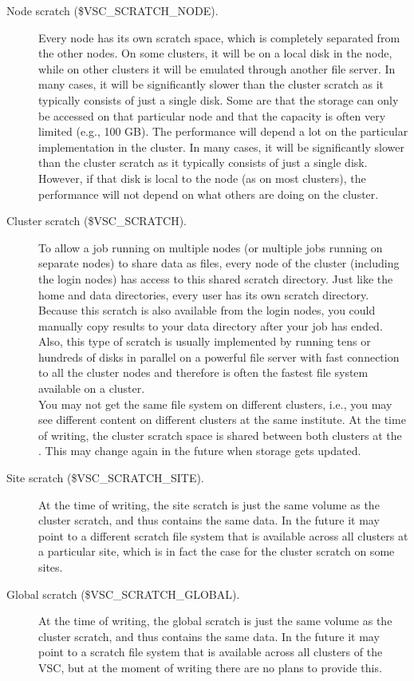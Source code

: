 \begin{description}
\item[Node scratch (\$VSC\_SCRATCH\_NODE).]
Every node has its own scratch space, which is completely separated from the other nodes.
On some clusters, it will be on a local disk in the node, while on other
clusters it will be emulated through another file server. In many cases,
it will be significantly slower than the cluster scratch as it typically
consists of just a single disk.
Some  are that the storage
can only be accessed on that particular node and that the capacity is often very limited (e.g., 100 GB).
The performance will depend a lot on the particular implementation in the cluster. In many cases,
it will be significantly slower than the cluster scratch as it typically
consists of just a single disk. However, if that disk is local to the node
(as on most clusters), the performance will not depend on what others are
doing on the cluster.
\item[Cluster scratch (\$VSC\_SCRATCH).]
To allow a job running on multiple nodes (or multiple jobs running on
separate nodes) to share data as files, every node of the cluster
(including the login nodes) has access to this shared scratch directory.
Just like the home and data directories, every user has its own scratch
directory. Because this scratch is also available from the login nodes, you
could manually copy results to your data directory after your job has
ended. Also, this type of scratch is usually implemented by running tens or
hundreds of disks in parallel on a powerful file server with fast connection
to all the cluster nodes and therefore is often the fastest file system
available on a cluster. \\
You may not get the same file system on different clusters, i.e., you
may see different content on different clusters at the same institute.
\ifantwerpen
  At the time of writing, the cluster scratch space is shared between both clusters
  at the \university. This may change again in the future when storage gets
  updated.
\fi
\item[Site scratch (\$VSC\_SCRATCH\_SITE).]
At the time of writing, the site scratch is just the same
volume as the cluster scratch, and thus contains the same data.
In the future it may point to a different scratch file system
that is available across all clusters at a particular site, which is in
fact the case for the cluster scratch on some sites.
\item[Global scratch (\$VSC\_SCRATCH\_GLOBAL).]
At the time of writing, the global scratch is just the same
volume as the cluster scratch, and thus contains the same data.
In the future it may point to a scratch file system
that is available across all clusters of the VSC, but at the moment
of writing there are no plans to provide this.
\end{description}

